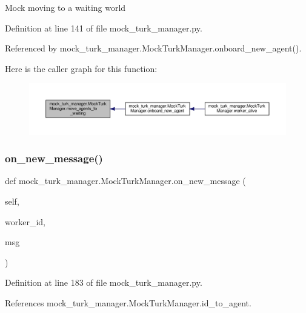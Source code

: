 \begin{DoxyVerb}Mock moving to a waiting world\end{DoxyVerb}
 

Definition at line 141 of file mock\+\_\+turk\+\_\+manager.\+py.



Referenced by mock\+\_\+turk\+\_\+manager.\+Mock\+Turk\+Manager.\+onboard\+\_\+new\+\_\+agent().

Here is the caller graph for this function\+:
\nopagebreak
\begin{figure}[H]
\begin{center}
\leavevmode
\includegraphics[width=350pt]{classmock__turk__manager_1_1MockTurkManager_a7e29a2707b002fbf2d18cc94e075f0a1_icgraph}
\end{center}
\end{figure}
\mbox{\label{classmock__turk__manager_1_1MockTurkManager_af42c5f9de299e35fd89cd2508b88fbca}} 
\subsubsection{\texorpdfstring{on\+\_\+new\+\_\+message()}{on\_new\_message()}}
{\footnotesize\ttfamily def mock\+\_\+turk\+\_\+manager.\+Mock\+Turk\+Manager.\+on\+\_\+new\+\_\+message (\begin{DoxyParamCaption}\item[{}]{self,  }\item[{}]{worker\+\_\+id,  }\item[{}]{msg }\end{DoxyParamCaption})}



Definition at line 183 of file mock\+\_\+turk\+\_\+manager.\+py.



References mock\+\_\+turk\+\_\+manager.\+Mock\+Turk\+Manager.\+id\+\_\+to\+\_\+agent.

